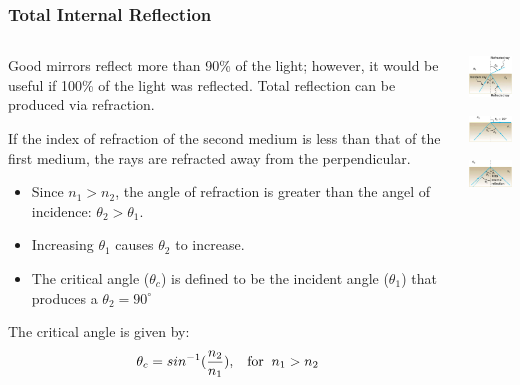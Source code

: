 \documentclass{beamer}
\begin{document}
\begin{frame}\frametitle{Total Internal Reflection}

\begin{columns}
\begin{column}{9.5cm}
Good mirrors reflect more than 90\% of the light; however, it would be useful if 100\% of the light was reflected. Total reflection can be produced via refraction.\newline

If the index of refraction of the second medium is less than that of the first medium, the rays are refracted away from the perpendicular. 

\begin{itemize}
\item Since $n_1 > n_2$, the angle of refraction is greater than the angel of incidence: $\theta_2 > \theta_1$.
\item Increasing $\theta_1$ causes $\theta_2$ to increase.
\item The critical angle ($\theta_c$) is defined to be the incident angle ($\theta_1$) that produces a $\theta_2 = 90^\circ$ 
\end{itemize}

The critical angle is given by:
\begin{equation}
\theta_c = sin^{-1}(\frac{n_2}{n_1}), \hspace{3mm} \text{for} \hspace{2mm}  n_1 > n_2
\end{equation}

\end{column}
\begin{column}{3cm}
\begin{center}

\includegraphics[width=2.5cm]{fig/tir1.png}

\includegraphics[width=2.5cm]{fig/tir2.png}

\includegraphics[width=2.5cm]{fig/tir3.png}

\end{center}
\end{column}
\end{columns}
\end{frame}
\end{document}
